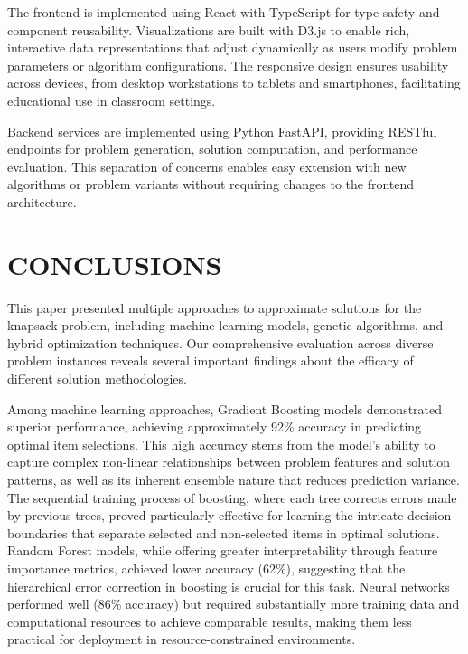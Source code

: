 \documentclass[conference, a4paper]{IEEEtran}
\begin{document}
The frontend is implemented using React with TypeScript for type safety and component reusability. Visualizations are built with D3.js to enable rich, interactive data representations that adjust dynamically as users modify problem parameters or algorithm configurations. The responsive design ensures usability across devices, from desktop workstations to tablets and smartphones, facilitating educational use in classroom settings.

Backend services are implemented using Python FastAPI, providing RESTful endpoints for problem generation, solution computation, and performance evaluation. This separation of concerns enables easy extension with new algorithms or problem variants without requiring changes to the frontend architecture.

\section{CONCLUSIONS}

This paper presented multiple approaches to approximate solutions for the knapsack problem, including machine learning models, genetic algorithms, and hybrid optimization techniques. Our comprehensive evaluation across diverse problem instances reveals several important findings about the efficacy of different solution methodologies.

Among machine learning approaches, Gradient Boosting models demonstrated superior performance, achieving approximately 92\% accuracy in predicting optimal item selections. This high accuracy stems from the model's ability to capture complex non-linear relationships between problem features and solution patterns, as well as its inherent ensemble nature that reduces prediction variance. The sequential training process of boosting, where each tree corrects errors made by previous trees, proved particularly effective for learning the intricate decision boundaries that separate selected and non-selected items in optimal solutions. Random Forest models, while offering greater interpretability through feature importance metrics, achieved lower accuracy (62\%), suggesting that the hierarchical error correction in boosting is crucial for this task. Neural networks performed well (86\% accuracy) but required substantially more training data and computational resources to achieve comparable results, making them less practical for deployment in resource-constrained environments.
\end{document}
